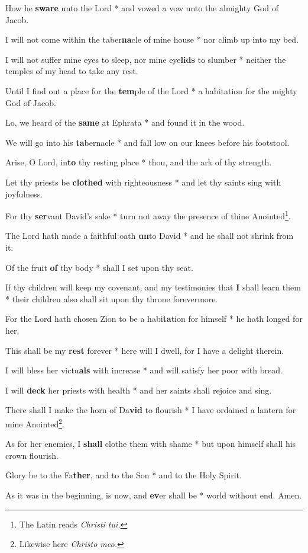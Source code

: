 \begin{multicols}{2}
	How he \textbf{sware} unto the Lord * and vowed a vow unto the almighty God of Jacob.
	
	I will not come within the taber\textbf{na}cle of mine house * nor climb up into my bed.
	
	I will not suffer mine eyes to sleep, nor mine eye\textbf{lids} to slumber * neither the temples of my head to take any rest.
	
	Until I find out a place for the \textbf{tem}ple of the Lord * a habitation for the mighty God of Jacob.
	
	Lo, we heard of the \textbf{same} at Ephrata * and found it in the wood.
	
	We will go into his \textbf{ta}bernacle * and fall low on our knees before his footstool.
	
	Arise, O Lord, in\textbf{to} thy resting place * thou, and the ark of thy strength.
	
	Let thy priests be \textbf{clothed} with righteousness * and let thy saints sing with joyfulness.
	
	For thy \textbf{ser}vant David's sake * turn not away the presence of thine Anointed\footnote{The Latin reads \textit{Christi tui.}}.
	
	The Lord hath made a faithful oath \textbf{un}to David * and he shall not shrink from it.
	
	Of the fruit \textbf{of} thy body * shall I set upon thy seat.
	
	If thy children will keep my covenant, and my testimonies that \textbf{I} shall learn them * their children also shall sit upon thy throne forevermore.
	
	For the Lord hath chosen Zion to be a habi\textbf{ta}tion for himself * he hath longed for her.
	
	This shall be my \textbf{rest} forever * here will I dwell, for I have a delight therein.
	
	I will bless her victu\textbf{als} with increase * and will satisfy her poor with bread.
	
	I will \textbf{deck} her priests with health * and her saints shall rejoice and sing.
	
	There shall I make the horn of Da\textbf{vid} to flourish * I have ordained a lantern for mine Anointed\footnote{Likewise here \textit{Christo meo.}}.
	
	As for her enemies, I \textbf{shall} clothe them with shame * but upon himself shall his crown flourish.
	
	Glory be to the Fa\textbf{ther}, and to the Son * and to the Holy Spirit.
	
	As it was in the beginning, is now, and \textbf{ev}er shall be * world without end. Amen.
\end{multicols}
